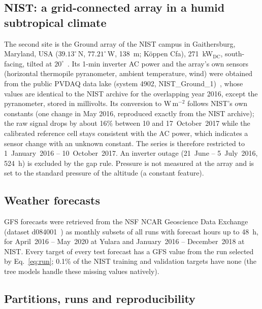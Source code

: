 \subsection{NIST: a grid-connected array in a humid subtropical climate}
\label{subsec:nist}

The second site is the Ground array of the NIST campus in Gaithersburg, Maryland, USA
($39.13^\circ$\,N, $77.21^\circ$\,W, 138~m; K\"oppen Cfa), 271~kW$_\mathrm{DC}$, south-facing,
tilted at $20^\circ$~\cite{boyd2017nist}. Its 1-min inverter AC power and the array's own
sensors (horizontal thermopile pyranometer, ambient temperature, wind) were obtained from the
public PVDAQ data lake (system 4902, NIST\_Ground\_1)~\cite{deline2021pvdaq}, whose values are
identical to the NIST archive for the overlapping year 2016, except the pyranometer, stored in
millivolts. Its conversion to W\,m$^{-2}$ follows NIST's own constants (one change in May 2016,
reproduced exactly from the NIST archive); the raw signal drops by about 16\% between 10 and
17~October~2017 while the calibrated reference cell stays consistent with the AC power, which
indicates a sensor change with an unknown constant. The series is therefore restricted to
1~January~2016 -- 10~October~2017. An inverter outage (21~June -- 5~July~2016, 524~h) is
excluded by the gap rule. Pressure is not measured at the array and is set to the standard
pressure of the altitude (a constant feature).

\subsection{Weather forecasts}
\label{subsec:gfs_data}

GFS forecasts were retrieved from the NSF NCAR Geoscience Data Exchange (dataset
d084001~\cite{ncep2015gfs}) as monthly subsets of all runs with forecast hours up to 48~h, for
April~2016 -- May~2020 at Yulara and January~2016 -- December~2018 at NIST. Every target of
every test forecast has a GFS value from the run selected by Eq.~\eqref{eq:run}; 0.1\% of the
NIST training and validation targets have none (the tree models handle these missing values
natively).

\subsection{Partitions, runs and reproducibility}
\label{subsec:partitions}


